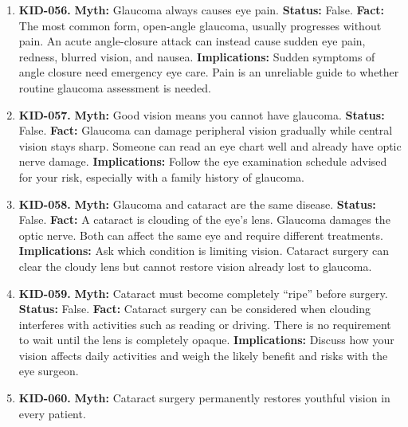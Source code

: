 \documentclass[11pt,oneside]{book}
\begin{document}
\begin{enumerate}[leftmargin=0pt,labelwidth=0pt,labelsep=0pt,itemindent=0pt]
\item[] \textbf{KID-056.} \textbf{Myth:} Glaucoma always causes eye pain.\newline
\textbf{Status:} False.\newline
\textbf{Fact:} The most common form, open-angle glaucoma, usually progresses without pain. An acute angle-closure attack can instead cause sudden eye pain, redness, blurred vision, and nausea. \cite{ref174}\newline
\textbf{Implications:} Sudden symptoms of angle closure need emergency eye care. Pain is an unreliable guide to whether routine glaucoma assessment is needed.
\item[] \textbf{KID-057.} \textbf{Myth:} Good vision means you cannot have glaucoma.\newline
\textbf{Status:} False.\newline
\textbf{Fact:} Glaucoma can damage peripheral vision gradually while central vision stays sharp. Someone can read an eye chart well and already have optic nerve damage. \cite{ref174}\newline
\textbf{Implications:} Follow the eye examination schedule advised for your risk, especially with a family history of glaucoma.
\item[] \textbf{KID-058.} \textbf{Myth:} Glaucoma and cataract are the same disease.\newline
\textbf{Status:} False.\newline
\textbf{Fact:} A cataract is clouding of the eye's lens. Glaucoma damages the optic nerve. Both can affect the same eye and require different treatments. \cite{ref174,ref175}\newline
\textbf{Implications:} Ask which condition is limiting vision. Cataract surgery can clear the cloudy lens but cannot restore vision already lost to glaucoma.
\item[] \textbf{KID-059.} \textbf{Myth:} Cataract must become completely ``ripe'' before surgery.\newline
\textbf{Status:} False.\newline
\textbf{Fact:} Cataract surgery can be considered when clouding interferes with activities such as reading or driving. There is no requirement to wait until the lens is completely opaque. \cite{ref175}\newline
\textbf{Implications:} Discuss how your vision affects daily activities and weigh the likely benefit and risks with the eye surgeon.
\item[] \textbf{KID-060.} \textbf{Myth:} Cataract surgery permanently restores youthful vision in every patient.\newline

\end{enumerate}
\end{document}
